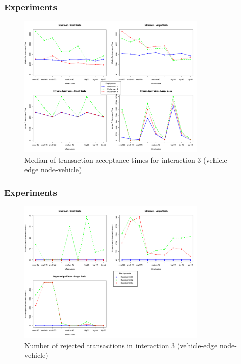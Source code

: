 \documentclass{beamer}
\begin{document}
	\begin{frame}
		\frametitle{Experiments}
		
		\begin{figure}
			\centering
			\includegraphics[width=0.8\textwidth]{figures/interaction3_median_accept_time.png}
			\vspace{-0.5cm}
			\caption{Median of transaction acceptance times for interaction 3 (vehicle-edge node-vehicle)}
			\label{fig:experiments3}
		\end{figure}
		
	\end{frame}
	
	
	\begin{frame}
		\frametitle{Experiments}
		
		\begin{figure}
			\centering
			\includegraphics[width=0.8\textwidth]{figures/interaction3_rejected_tx.png}
			\vspace{-0.5cm}
			\caption{Number of rejected transactions in interaction 3 (vehicle-edge node-vehicle)}
			\label{fig:experiments4}
		\end{figure}
	
	\end{frame}
\end{document}
